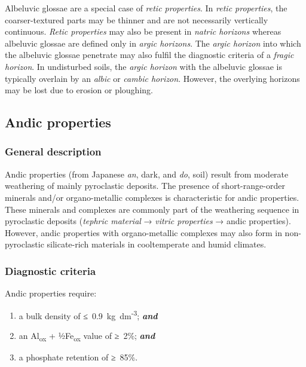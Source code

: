 \documentclass[
  letterpaper,
  DIV=11,
  numbers=noendperiod]{scrreprt}
\providecommand{\tightlist}{%
  \setlength{\itemsep}{0pt}\setlength{\parskip}{0pt}}\usepackage{longtable,booktabs,array}
\begin{document}
Albeluvic glossae are a special case of \emph{retic properties}. In
\emph{retic properties}, the coarser-textured parts may be thinner and
are not necessarily vertically continuous. \emph{Retic properties} may
also be present in \emph{natric horizons} whereas albeluvic glossae are
defined only in \emph{argic horizons}. The \emph{argic horizon} into
which the albeluvic glossae penetrate may also fulfil the diagnostic
criteria of a \emph{fragic horizon}. In undisturbed soils, the
\emph{argic horizon} with the albeluvic glossae is typically overlain by
an \emph{albic} or \emph{cambic horizon}. However, the overlying
horizons may be lost due to erosion or ploughing.

\hypertarget{andic-properties}{%
\subsection{Andic properties}\label{andic-properties}}

\hypertarget{general-description-42}{%
\subsubsection{General description}\label{general-description-42}}

Andic properties (from Japanese \emph{an}, dark, and \emph{do}, soil)
result from moderate weathering of mainly pyroclastic deposits. The
presence of short-range-order minerals and/or organo-metallic complexes
is characteristic for andic properties. These minerals and complexes are
commonly part of the weathering sequence in pyroclastic deposits
(\emph{tephric material} → \emph{vitric properties} → andic properties).
However, andic properties with organo-metallic complexes may also form
in non-pyroclastic silicate-rich materials in cooltemperate and humid
climates.

\hypertarget{diagnostic-criteria-42}{%
\subsubsection{Diagnostic criteria}\label{diagnostic-criteria-42}}

Andic properties require:

\begin{enumerate}
\def\labelenumi{\arabic{enumi}.}
\tightlist
\item
  a bulk density of ≤~0.9~kg~dm\textsuperscript{-3}; \textbf{\emph{and}}
\item
  an Al\textsubscript{ox} + ½Fe\textsubscript{ox} value of ≥~2\%;
  \textbf{\emph{and}}
\item
  a phosphate retention of ≥~85\%.
\end{enumerate}
\end{document}
